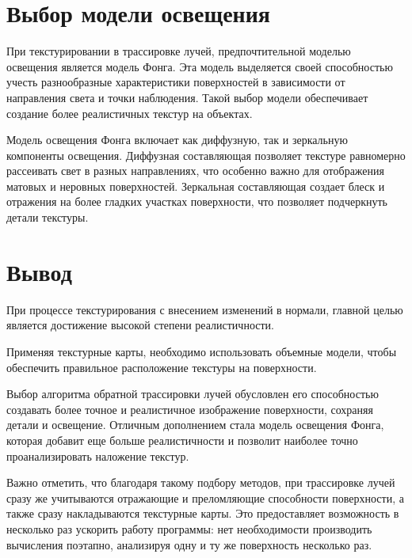 \section{Выбор модели освещения}

При текстурировании в трассировке лучей, предпочтительной моделью освещения является модель Фонга. Эта модель выделяется своей способностью учесть разнообразные характеристики поверхностей в зависимости от направления света и точки наблюдения. Такой выбор модели обеспечивает создание более реалистичных текстур на объектах.

Модель освещения Фонга включает как диффузную, так и зеркальную компоненты освещения. Диффузная составляющая позволяет текстуре равномерно рассеивать свет в разных направлениях, что особенно важно для отображения матовых и неровных поверхностей. Зеркальная составляющая создает блеск и отражения на более гладких участках поверхности, что позволяет подчеркнуть детали текстуры.

\section*{Вывод}

При процессе текстурирования с внесением изменений в нормали, главной целью является достижение высокой степени реалистичности.

Применяя текстурные карты, необходимо использовать объемные модели, чтобы обеспечить правильное расположение текстуры на поверхности.

Выбор алгоритма обратной трассировки лучей обусловлен его способностью создавать более точное и реалистичное изображение поверхности, сохраняя детали и освещение. Отличным дополнением стала модель освещения Фонга, которая добавит еще больше реалистичности и позволит наиболее точно проанализировать наложение текстур.

Важно отметить, что благодаря такому подбору методов, при трассировке лучей сразу же учитываются отражающие и преломляющие способности поверхности, а также сразу накладываются текстурные карты. Это предоставляет возможность в несколько раз ускорить работу программы: нет необходимости производить вычисления поэтапно, анализируя одну и ту же поверхность несколько раз.
